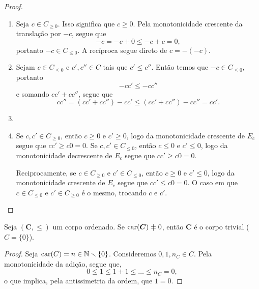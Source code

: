 \begin{proof}
	\begin{enumerate}	

	\item Seja $c \in C_{\geq 0}$. Isso significa que $c \geq 0$. Pela monotonicidade crescente da translação por $-c$, segue que
		\begin{equation*}
		-c = -c+0 \leq -c+c = 0,
		\end{equation*}
portanto $-c \in C_{\leq 0}$. A recíproca segue direto de $c=-(-c)$.

	\item Sejam $c \in C_{\leq 0}$ e $c',c'' \in C$ tais que $c' \leq c''$. Então temos que $-c \in C_{\leq 0}$, portanto
	\begin{equation*}
	-cc' \leq -cc''
	\end{equation*}
e somando $cc'+cc''$, segue que
	\begin{equation*}
	cc'' = (cc'+cc'')-cc' \leq (cc'+cc'')-cc'' = cc'.
	\end{equation*}
	
	\item 
	
	\item Se $c,c' \in C_{\geq 0}$, então $c \geq 0$ e $c' \geq 0$, logo da monotonicidade crescente de $E_c$ segue que $cc' \geq c0=0$. Se $c,c' \in C_{\leq 0}$, então $c \leq 0$ e $c' \leq 0$, logo da monotonicidade decrescente de $E_c$ segue que $cc' \geq c0=0$.

Reciprocamente, se $c \in C_{\geq 0}$ e $c' \in C_{\leq 0}$, então $c \geq 0$ e $c' \leq 0$, logo da monotonicidade crescente de $E_c$ segue que $cc' \leq c0=0$. O caso em que $c \in C_{\leq 0}$ e $c' \in C_{\geq 0}$ é o mesmo, trocando $c$ e $c'$.
	\end{enumerate}
\end{proof}

\begin{proposition}
Seja $(\bm C,\leq)$ um corpo ordenado. Se $\car(\bm C) \neq 0$, então $\bm C$ é o corpo trivial ($C=\{0\}$).
\end{proposition}
\begin{proof}
Seja $\operatorname{car}(C)=n \in \mathbb{N} \smallsetminus \{0\}$. Consideremos $0,1,n_C \in C$. Pela monotonicidade da adição, segue que,
	\begin{equation*}
	0 \leq 1 \leq 1+1 \leq \ldots \leq n_C=0,
	\end{equation*}
o que implica, pela antissimetria da ordem, que $1=0$.
\end{proof}

